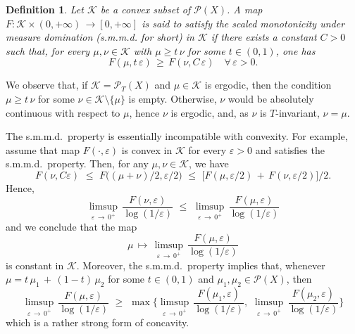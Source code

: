 \documentclass[11pt,a4paper,reqno]{amsart}
\theoremstyle{plain}
\theoremstyle{definition}
\newtheorem{definition}[theorem]{Definition}
\newcommand{\ep} {\varepsilon}
\newcommand{\vep}{\varepsilon}
\newcommand{\cK}{{\mathcal K}}
\newcommand{\cP}{{\mathcal P}}
\begin{document}
\begin{definition}\label{def:MP}
\emph{Let $\cK$ be a convex subset of $\cP(X)$. A map $F\colon \cK \times (0,+\infty)\, \to  [0, +\infty]$ is said to satisfy the \emph{scaled monotonicity under measure domination} (s.m.m.d. for short) in $\cK$ if there exists a constant $C>0$ such that, for every $\mu, \nu \in \cK$ with $\mu \geq t\,\nu$ for some $t \in (0,1)$, one has
$$F(\mu, t\,\vep) \, \geq\, F(\nu, C\,\vep) \quad \forall\, \vep>0.$$}
\end{definition}

\smallskip

We observe that, if $\cK = \cP_T(X)$ and $\mu \in \cK$ is ergodic, then the condition $\mu \geq t\,\nu$ for some $\nu \in \cK \setminus \{\mu\}$ is empty. Otherwise, $\nu$ would be absolutely continuous with respect to $\mu$, hence $\nu$ is ergodic, and, as $\nu$ is $T$-invariant, $\nu = \mu$.\\

\smallskip

The s.m.m.d.~property is essentially incompatible with convexity. For example, assume that map $F(\cdot,\ep)$ is convex in $\cK$ for every $\ep>0$ and satisfies the s.m.m.d.~property. Then, for any $\mu, \nu \in \cK$, we have $$F(\nu,C\ep)\,\,\leq\,\,F\big((\mu+\nu)/2,\ep/2\big)\,\,\leq\,\,
\big[F(\mu,\ep/2)\,+\,F(\nu,\ep/2)\big]/2.$$ 
Hence,
$$\limsup_{\vep \, \to \, 0^+} \,\frac{F(\nu,\ep)}{\log(1/\ep)}\,\,\leq\,\,\limsup_{\vep \, \to \, 0^+} \,\frac{F(\mu,\ep)}{\log(1/\ep)}$$
and we conclude that the map 
$$\mu\,\mapsto\,\limsup_{\vep \, \to \, 0^+} \,\frac{F(\mu,\ep)}{\log(1/\ep)}$$ is constant in $\cK$. Moreover, the s.m.m.d.~property implies that, whenever $\mu= t\,\mu_1\,+\,(1-t)\,\mu_2$ for some $t \in (0,1)$ and $\mu_1, \mu_2 \in \cP(X)$, then  \begin{equation}\label{StrongConcavity}
    \limsup_{\vep \, \to \, 0^+} \,\frac{F(\mu,\ep)}{\log(1/\ep)}\,\,\geq\,\,\max \Bigg\{\limsup_{\vep \, \to \, 0^+} \,\frac{F(\mu_1,\ep)}{\log(1/\ep)},\,\,\limsup_{\vep \, \to \, 0^+} \,\frac{F(\mu_2,\ep)}{\log(1/\ep)}\Bigg\}
\end{equation} which is a rather strong form of concavity.


\smallskip
\end{document}
